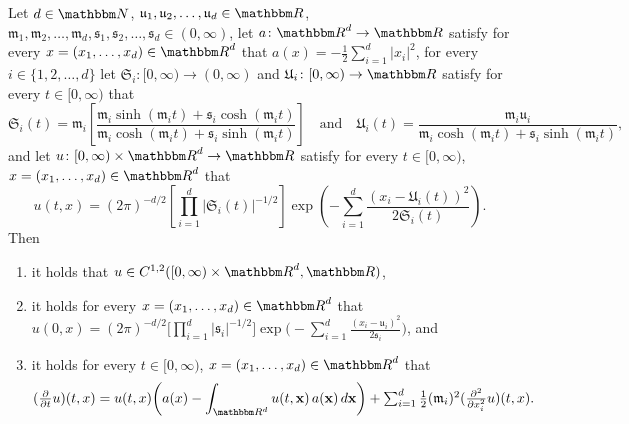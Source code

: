 \begin{lemma}\label{lem:aniso_mutator_selector}
	Let
	$d \in \N$,
	$\mathfrak{u}_1,\mathfrak{u}_2, \dots,\mathfrak{u}_d\in \R$,
	$\mathfrak{m}_1,\mathfrak{m}_2, \dots,\mathfrak{m}_d,
	\mathfrak{s}_1,\mathfrak{s}_2, \dots,\mathfrak{s}_d \in (0,\infty)$,
	let
	$a \colon \R^d \to \R$
	satisfy for every
	$x = (x_1, \dots,x_d) \in \R^d$
	that
	$a(x) = -\frac{1}{2} \sum_{i=1}^d|x_i|^2$,
	for every $i \in \{1,2,\dots,d\}$
	let
	$\mathfrak{S}_i \colon [0,\infty) \to (0,\infty)$
	and
	$\mathfrak{U}_i \colon [0,\infty) \to \R$
	satisfy for every
	$t \in [0,\infty)$
	that
	\begin{equation}\label{lem:S_U}
	\mathfrak{S}_i(t) = \mathfrak{m}_i \left[ \frac{\mathfrak{m}_i \sinh(\mathfrak{m}_i  t) + \mathfrak{s}_i \cosh(\mathfrak{m}_i t)}{\mathfrak{m}_i \cosh(\mathfrak{m}_i  t) + \mathfrak{s}_i \sinh(\mathfrak{m}_i t)}\right]\! \quad \text{and} \quad
	\mathfrak{U}_i(t) = \frac{\mathfrak{m}_i \mathfrak{u}_i}{\mathfrak{m}_i \cosh(\mathfrak{m}_i  t) + \mathfrak{s}_i \sinh(\mathfrak{m}_i t)},
	\end{equation}
	and let
	$u \colon [0,\infty) \times \R^d \to \R $
	satisfy for every
	$t \in [0,\infty)$,
	$x = (x_1,\dots,x_d)\in \R^d$
	that
	\begin{equation}\label{eq:lem_aniso}
		u(t,x) = (2\pi)^{- d/2} \left[ \prod_{ i = 1 }^d |\mathfrak{S}_i(t)|^{- 1/2} \right]     \exp \! \left(-\sum_{i = 1}^d \frac{(x_i -\mathfrak{U}_i(t) )^2}{2\mathfrak{S}_i(t)}\right).
	\end{equation}
	Then
	\begin{enumerate}[label=(\roman*)]
			\item \label{lem:it_smoothness} it holds that
			$u  \in C^{1,2}([0,\infty)\times\R^d,\R)$,
			\item \label{lem:it_u0} it holds for every
			$x = (x_1,\dots,x_d)\in \R^d$
			that
			$u(0,x) = (2\pi)^{-d/2} \big[\prod_{ i = 1 }^d |\mathfrak{s}_i|^{-1/2}\big] \exp \! \big(-\sum_{i = 1}^d \frac{(x_i - \mathfrak{u}_i )^2}{2\mathfrak{s}_i}\big)$,
			and
	    \item \label{lem:it_eq} it holds for every
			$t \in [0,\infty)$,
			$x = (x_1,\dots,x_d)\in \R^d$
			that
	    \begin{equation}
	        (\tfrac{\partial }{\partial t}u) (t,x) = u(t,x)\!  \left(a(x) - \int_{\R^d} u(t,{\textbf x})\, a({\textbf x}) \, d{\textbf x} \right) + \smallsum_{i=1}^{d} \frac{1}{2} (\mathfrak{m}_i)^2(\tfrac{\partial^2 }{\partial x_i^2} u) (t,x).
	        \label{eq:lemma_replicator_mutator}
	    \end{equation}

	\end{enumerate}
\end{lemma}

